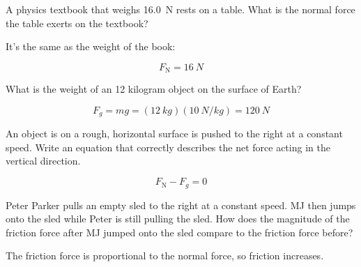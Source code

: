\documentclass[answers]{exam}
\begin{document}
\begin{questions}
\question 
A physics textbook that weighs \SI{16.0}{N} rests on a table. What is the normal force the table exerts on the textbook?

\begin{solutionorbox}[1cm]
It's the same as the weight of the book:

\begin{equation*}
    F_\mathrm{N} = \SI{16}{N}
\end{equation*}
\end{solutionorbox}



\question 
What is the weight of an 12 kilogram object on the surface of Earth?

\begin{solutionorbox}[2cm]
\begin{equation*}
    F_g = mg = (\SI{12}{kg})(\SI{10}{N/kg}) = \boxed{\SI{120}{N}}
\end{equation*}
\end{solutionorbox}


\question
An object is on a rough, horizontal surface is pushed to the right at a constant speed. Write an equation that correctly describes the net force acting in the vertical direction. 

\begin{center}
\end{center}

\begin{solutionorbox}[2cm]
\begin{equation*}
    F_\mathrm{N} - F_g = 0
\end{equation*}
\end{solutionorbox}

\question 
Peter Parker pulls an empty sled to the right at a constant speed. MJ then jumps onto the sled while Peter is still pulling the sled. How does the magnitude of the friction force after MJ jumped onto the sled compare to the friction force before?

\ifprintanswers
\else
\fillwithlines{1.5cm}
\fi

\begin{solution}
    The friction force is proportional to the normal force, so friction increases.
\end{solution}


\end{questions}
\end{document}
